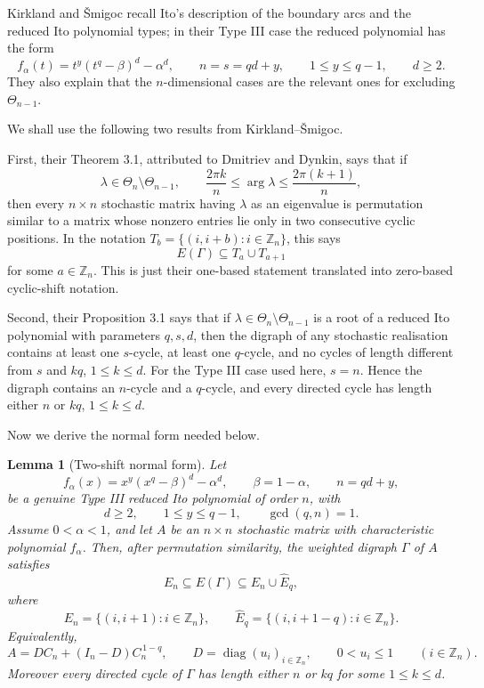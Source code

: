 \documentclass[11pt]{article}
\numberwithin{equation}{section}
\newtheorem{lemma}[theorem]{Lemma}
\newcommand{\Zn}{\mathbb Z_n}
\newcommand{\Ehat}{\widehat E_q}
\begin{document}
Kirkland and \v{S}migoc recall Ito's description of the boundary arcs and the
reduced Ito polynomial types; in their Type III case the reduced polynomial
has the form
\[
        f_\alpha(t)=t^y(t^q-\beta)^d-\alpha^d,
        \qquad n=s=qd+y,
        \qquad 1\le y\le q-1,
        \qquad d\ge2.
\]
They also explain that the $n$-dimensional cases are the relevant ones for
excluding $\Theta_{n-1}$.

We shall use the following two results from Kirkland--\v{S}migoc.

First, their Theorem 3.1, attributed to Dmitriev and Dynkin, says that if
\[
        \lambda\in\Theta_n\setminus\Theta_{n-1},
        \qquad
        \frac{2\pi k}{n}\le \arg\lambda\le\frac{2\pi(k+1)}{n},
\]
then every $n\times n$ stochastic matrix having $\lambda$ as an eigenvalue is
permutation similar to a matrix whose nonzero entries lie only in two
consecutive cyclic positions. In the notation
$T_b=\{(i,i+b):i\in\Zn\}$, this says
\[
        E(\Gamma)\subseteq T_a\cup T_{a+1}
\]
for some $a\in\Zn$. This is just their one-based statement translated into
zero-based cyclic-shift notation.

Second, their Proposition 3.1 says that if
$\lambda\in\Theta_n\setminus\Theta_{n-1}$ is a root of a reduced Ito
polynomial with parameters $q,s,d$, then the digraph of any stochastic
realisation contains at least one $s$-cycle, at least one $q$-cycle, and no
cycles of length different from $s$ and $kq$, $1\le k\le d$. For the Type III
case used here, $s=n$. Hence the digraph contains an $n$-cycle and a
$q$-cycle, and every directed cycle has length either $n$ or $kq$,
$1\le k\le d$.

Now we derive the normal form needed below.

\begin{lemma}[Two-shift normal form]\label{lem:two-shift}
Let
\[
        f_\alpha(x)=x^y(x^q-\beta)^d-\alpha^d,
        \qquad \beta=1-\alpha,
        \qquad n=qd+y,
\]
be a genuine Type III reduced Ito polynomial of order $n$, with
\[
        d\ge2,
        \qquad 1\le y\le q-1,
        \qquad \gcd(q,n)=1.
\]
Assume $0<\alpha<1$, and let $A$ be an $n\times n$ stochastic matrix with
characteristic polynomial $f_\alpha$. Then, after permutation similarity, the
weighted digraph $\Gamma$ of $A$ satisfies
\[
        E_n\subseteq E(\Gamma)\subseteq E_n\cup\Ehat,
\]
where
\[
        E_n=\{(i,i+1):i\in\Zn\},
        \qquad
        \Ehat=\{(i,i+1-q):i\in\Zn\}.
\]
Equivalently,
\[
        A=DC_n+(I_n-D)C_n^{\,1-q},
        \qquad D=\operatorname{diag}(u_i)_{i\in\Zn},
        \qquad
        0<u_i\le1 \qquad (i\in\Zn).
\]
Moreover every directed cycle of $\Gamma$ has length either $n$ or $kq$ for
some $1\le k\le d$.
\end{lemma}
\end{document}
